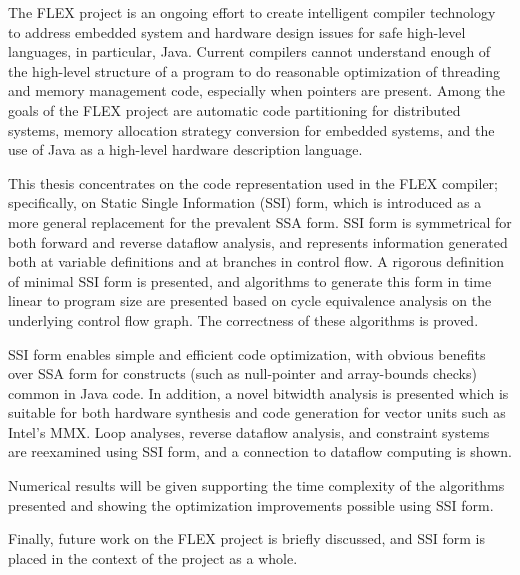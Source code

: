 \documentclass[12pt,twoside]{article}
\begin{document}
The FLEX project is an ongoing effort to create intelligent
compiler technology to address embedded system and hardware design
issues for safe high-level languages, in particular, Java.
Current compilers cannot understand enough of the high-level structure
of a program to do reasonable optimization of threading and memory
management code, especially when pointers are present. Among the goals
of the FLEX project are automatic code partitioning for distributed
systems, memory allocation strategy conversion for embedded systems,
and the use of Java as a high-level hardware description language.

This thesis concentrates on the code representation used in the
FLEX compiler; specifically, on Static Single Information (SSI)
form, which is introduced as a more general replacement for the
prevalent SSA form.  SSI form is symmetrical for both forward and
reverse dataflow analysis, and represents information generated both
at variable definitions and at branches in control flow.  A rigorous
definition of minimal SSI form is presented, and algorithms to
generate this form in time linear to program size are
presented based on cycle equivalence analysis on the underlying
control flow graph.  The correctness of these algorithms is proved.

SSI form enables simple and efficient code optimization, with obvious
benefits over SSA form for constructs (such as null-pointer and
array-bounds checks) common in Java code.  In addition, a novel
bitwidth analysis is presented which is suitable for both hardware
synthesis and code generation for vector units such as Intel's MMX.
Loop analyses, reverse dataflow analysis, and constraint systems are
reexamined using SSI form, and a connection to dataflow computing is
shown.

Numerical results will be given supporting the time complexity of the
algorithms presented and showing the optimization improvements
possible using SSI form.

Finally, future work on the FLEX project is briefly discussed, and
SSI form is placed in the context of the project as a whole.
\end{document}
